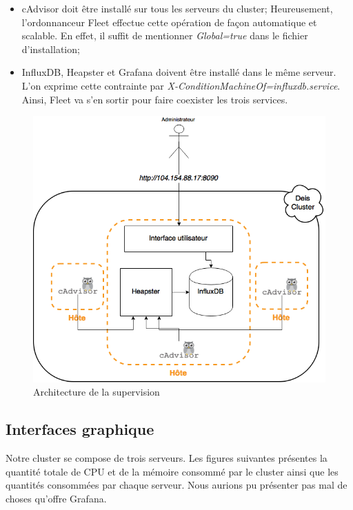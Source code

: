 \begin{onehalfspace}
\begin{itemize}
	\item cAdvisor doit être installé sur tous les serveurs du cluster; Heureusement, l'ordonnanceur Fleet effectue cette opération de façon automatique et scalable. En effet, il suffit de mentionner \emph{Global=true} dans le fichier d'installation;
	\item InfluxDB, Heapster et Grafana doivent être installé dans le même serveur. L'on exprime cette contrainte par \emph{X-ConditionMachineOf=influxdb.service}. Ainsi, Fleet va s'en sortir pour faire coexister les trois services.
\end{itemize}

\begin{figure}[H]
\centering
\includegraphics [scale=0.6]{chapitre5/assets/monitoring-cluster}
\caption{Architecture de la supervision}
\label{fig:}
\end{figure}


\subsection{Interfaces graphique}

Notre cluster se compose de trois serveurs. Les figures suivantes présentes la quantité totale de CPU et de la mémoire consommé par le cluster ainsi que les quantités consommées par chaque serveur. Nous aurions pu présenter pas mal de choses qu'offre Grafana.


\end{onehalfspace}
